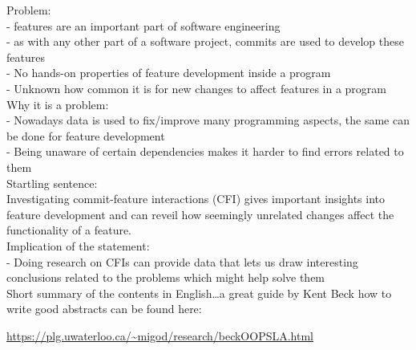 Problem: \\
- features are an important part of software engineering \\
- as with any other part of a software project, commits are used to develop these features \\
- No hands-on properties of feature development inside a program \\
- Unknown how common it is for new changes to affect features in a program \\
Why it is a problem: \\
- Nowadays data is used to fix/improve many programming aspects, the same can be done for feature development \\
- Being unaware of certain dependencies makes it harder to find errors related to them \\
Startling sentence: \\
Investigating commit-feature interactions (CFI) gives important insights into feature development and can reveil how seemingly unrelated changes affect the functionality of a feature. \\
Implication of the statement: \\
- Doing research on CFIs can provide data that lets us draw interesting conclusions related to the problems which might help solve them \\
Short summary of the contents in English\dots a great guide by
Kent Beck how to write good abstracts can be found here:
\begin{center}
\url{https://plg.uwaterloo.ca/~migod/research/beckOOPSLA.html}
\end{center}

\fi

\vfill

\endgroup

\vfill

